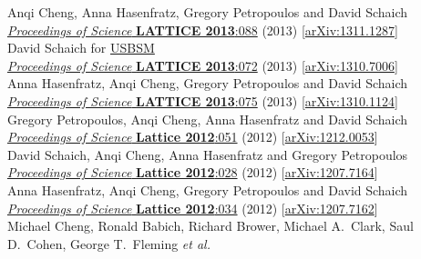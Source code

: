 \begin{spacelist}
\begin{revnumerate}
      Anqi Cheng, Anna Hasenfratz, Gregory Petropoulos and David Schaich \\
      \href{https://doi.org/10.22323/1.187.0088}{\textit{Proceedings of Science} \textbf{LATTICE 2013}:088} (2013) [\href{http://arxiv.org/abs/1311.1287}{arXiv:1311.1287}]
    \pagebreakitem
       \\
      David Schaich for \href{http://bsm.physics.yale.edu}{USBSM} \\
      \href{https://doi.org/10.22323/1.187.0072}{\textit{Proceedings of Science} \textbf{LATTICE 2013}:072} (2013) [\href{http://arxiv.org/abs/1310.7006}{arXiv:1310.7006}]
    \pagebreakitem
       \\
      Anna Hasenfratz, Anqi Cheng, Gregory Petropoulos and David Schaich \\
      \href{https://doi.org/10.22323/1.187.0075}{\textit{Proceedings of Science} \textbf{LATTICE 2013}:075} (2013) [\href{http://arxiv.org/abs/1310.1124}{arXiv:1310.1124}]
    \pagebreakitem
       \\
      Gregory Petropoulos, Anqi Cheng, Anna Hasenfratz and David Schaich \\
      \href{https://doi.org/10.22323/1.164.0051}{\textit{Proceedings of Science} \textbf{Lattice 2012}:051} (2012) [\href{http://arxiv.org/abs/1212.0053}{arXiv:1212.0053}]
    \pagebreakitem
       \\
      David Schaich, Anqi Cheng, Anna Hasenfratz and Gregory Petropoulos \\
      \href{https://doi.org/10.22323/1.164.0028}{\textit{Proceedings of Science} \textbf{Lattice 2012}:028} (2012) [\href{http://arxiv.org/abs/1207.7164}{arXiv:1207.7164}]
    \pagebreakitem
       \\
      Anna Hasenfratz, Anqi Cheng, Gregory Petropoulos and David Schaich \\
      \href{https://doi.org/10.22323/1.164.0034}{\textit{Proceedings of Science} \textbf{Lattice 2012}:034} (2012) [\href{http://arxiv.org/abs/1207.7162}{arXiv:1207.7162}]
    \pagebreakitem
       \\
      Michael Cheng, Ronald Babich, Richard Brower, Michael A.~Clark, Saul D.~Cohen, George T.~Fleming \textit{et al.} \\

\end{revnumerate}
\end{spacelist}
